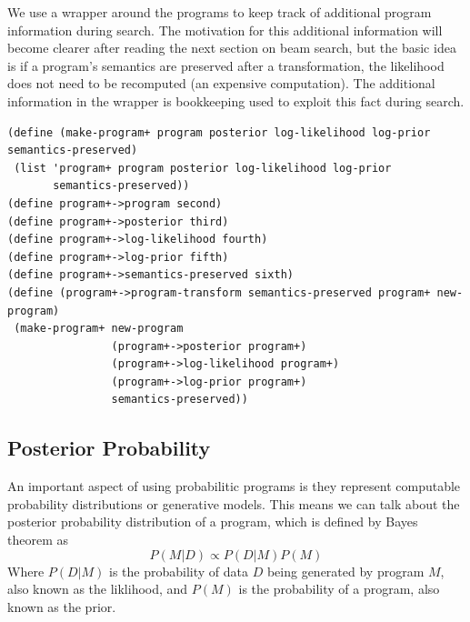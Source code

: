 \documentclass[a4paper,10pt]{article}
\begin{document}
We use a wrapper around the programs to keep track of additional program information during search.  The motivation for this additional information will become clearer after reading the next section on beam search, but the basic idea is if a program's semantics are preserved after a transformation, the likelihood does not need to be recomputed (an expensive computation). The additional information in the wrapper is bookkeeping used to exploit this fact during search.  
\begin{lstlisting}[frame=trBL]
(define (make-program+ program posterior log-likelihood log-prior semantics-preserved)
 (list 'program+ program posterior log-likelihood log-prior 
       semantics-preserved))
(define program+->program second)
(define program+->posterior third)
(define program+->log-likelihood fourth)
(define program+->log-prior fifth)
(define program+->semantics-preserved sixth)
(define (program+->program-transform semantics-preserved program+ new-program)
 (make-program+ new-program 
                (program+->posterior program+) 
                (program+->log-likelihood program+) 
                (program+->log-prior program+) 
                semantics-preserved))
\end{lstlisting}


\subsection{Posterior Probability}
An important aspect of using probabilitic programs is they represent computable probability distributions or generative models.  This means we can talk about the posterior probability distribution of a program, which is defined by Bayes theorem as 
\begin{equation}P(M|D)\propto P(D|M)P(M)\end{equation}
Where $P(D|M)$ is the probability of data $D$ being generated by program $M$, also known as the liklihood, and $P(M)$ is the probability of a program, also known as the prior.
\end{document}
